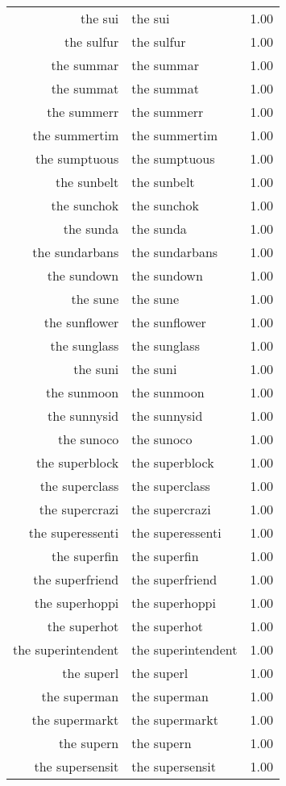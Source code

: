 \begin{table}[ht]
\begin{tabular}{rlr}
  the sui & the sui & 1.00 \\ 
  the sulfur & the sulfur & 1.00 \\ 
  the summar & the summar & 1.00 \\ 
  the summat & the summat & 1.00 \\ 
  the summerr & the summerr & 1.00 \\ 
  the summertim & the summertim & 1.00 \\ 
  the sumptuous & the sumptuous & 1.00 \\ 
  the sunbelt & the sunbelt & 1.00 \\ 
  the sunchok & the sunchok & 1.00 \\ 
  the sunda & the sunda & 1.00 \\ 
  the sundarbans & the sundarbans & 1.00 \\ 
  the sundown & the sundown & 1.00 \\ 
  the sune & the sune & 1.00 \\ 
  the sunflower & the sunflower & 1.00 \\ 
  the sunglass & the sunglass & 1.00 \\ 
  the suni & the suni & 1.00 \\ 
  the sunmoon & the sunmoon & 1.00 \\ 
  the sunnysid & the sunnysid & 1.00 \\ 
  the sunoco & the sunoco & 1.00 \\ 
  the superblock & the superblock & 1.00 \\ 
  the superclass & the superclass & 1.00 \\ 
  the supercrazi & the supercrazi & 1.00 \\ 
  the superessenti & the superessenti & 1.00 \\ 
  the superfin & the superfin & 1.00 \\ 
  the superfriend & the superfriend & 1.00 \\ 
  the superhoppi & the superhoppi & 1.00 \\ 
  the superhot & the superhot & 1.00 \\ 
  the superintendent & the superintendent & 1.00 \\ 
  the superl & the superl & 1.00 \\ 
  the superman & the superman & 1.00 \\ 
  the supermarkt & the supermarkt & 1.00 \\ 
  the supern & the supern & 1.00 \\ 
  the supersensit & the supersensit & 1.00 \\ 

\end{tabular}
\end{table}
